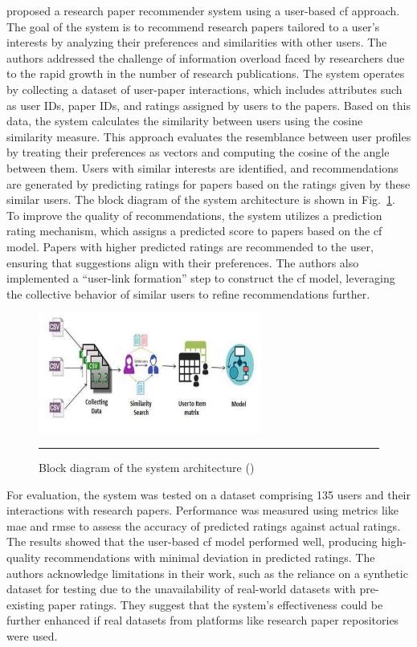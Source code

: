\textcite{Murali2019} proposed a research paper recommender system using a user-based \gls{cf} approach.
The goal of the system is to recommend research papers tailored to a user's interests by analyzing their preferences and similarities with other users.
The authors addressed the challenge of information overload faced by researchers due to the rapid growth in the number of research publications.
The system operates by collecting a dataset of user-paper interactions, which includes attributes such as user IDs, paper IDs, and ratings assigned by users to the papers. Based on this data, the system calculates the similarity between users using the cosine similarity measure. This approach evaluates the resemblance between user profiles by treating their preferences as vectors and computing the cosine of the angle between them.
Users with similar interests are identified, and recommendations are generated by predicting ratings for papers based on the ratings given by these similar users.
The block diagram of the system architecture is shown in Fig.~\ref{fig:murali}.
To improve the quality of recommendations, the system utilizes a prediction rating mechanism, which assigns a predicted score to papers based on the \gls{cf} model.
Papers with higher predicted ratings are recommended to the user, ensuring that suggestions align with their preferences.
The authors also implemented a ``user-link formation'' step to construct the \gls{cf} model, leveraging the collective behavior of similar users to refine recommendations further.

\begin{figure}[htbp]
    \centering
 \includegraphics[width=0.65\textwidth]{figures/literature-review/murali.png}
     \rule{35em}{0.5pt}
    \caption{Block diagram of the system architecture (\textcite{Murali2019})}
 \label{fig:murali}
\end{figure}

For evaluation, the system was tested on a dataset comprising 135 users and their interactions with research papers.
Performance was measured using metrics like \gls{mae} and \gls{rmse} to assess the accuracy of predicted ratings against actual ratings.
The results showed that the user-based \gls{cf} model performed well, producing high-quality recommendations with minimal deviation in predicted ratings.
The authors acknowledge limitations in their work, such as the reliance on a synthetic dataset for testing due to the unavailability of real-world datasets with pre-existing paper ratings.
They suggest that the system's effectiveness could be further enhanced if real datasets from platforms like research paper repositories were used.

